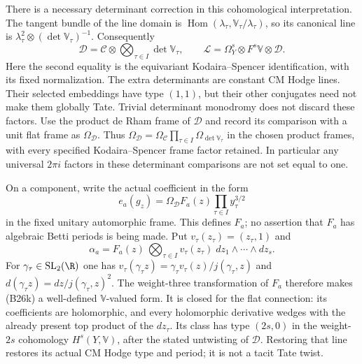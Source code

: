 \documentclass[11pt]{article}
\providecommand{\mathscr}[1]{\mathcal{#1}}
\theoremstyle{definition}\newtheorem{definition}[theorem]{Definition}\newtheorem{remark}[theorem]{Remark}
\begin{document}
There is a necessary determinant correction in this
cohomological interpretation.  The tangent bundle of the
line domain is $\operatorname{Hom}(\lambda_\tau,
\mathbb V_\tau/\lambda_\tau)$, so its canonical line is
$\lambda_\tau^2\otimes(\det\mathbb V_\tau)^{-1}$.
Consequently
\[
 \mathscr D=\mathscr C\otimes
                 \bigotimes_{\tau\in I}\det\mathbb V_\tau,
 \qquad
 \mathscr L=\Omega_Y^s\otimes F^s\mathbb V\otimes\mathscr D.
 \tag{B26i$'$}
\]
Here the second equality is the equivariant
Kodaira--Spencer identification, with its fixed
normalization.  The extra determinants are constant
CM Hodge lines.  Their selected embeddings have type
$(1,1)$, but their other conjugates need not make them
globally Tate.  Trivial determinant monodromy does not
discard these factors.  Use the product de Rham frame
of $\mathscr D$ and record its comparison with a unit
flat frame as $\Omega_{\mathscr D}$.  Thus
$\Omega_{\mathscr D}=\Omega_{\mathscr C}
\prod_{\tau\in I}\Omega_{\det\mathbb V_\tau}$ in the
chosen product frames, with every specified
Kodaira--Spencer frame factor retained.  In particular
any universal $2\pi i$ factors in these determinant
comparisons are not set equal to one.

On a component, write the actual coefficient in the form
\[
           e_a(g_z)=
              \Omega_{\mathscr D}F_a(z)
                          \prod_{\tau\in I}y_\tau^{3/2}
 \tag{B26j}
\]
in the fixed unitary automorphic frame.  This defines $F_a$;
no assertion that $F_a$ has algebraic Betti periods is being
made.  Put $v_\tau(z_\tau)=(z_\tau,1)$ and
\[
 \alpha_a=F_a(z)\,
       \bigotimes_{\tau\in I}v_\tau(z_\tau)
                   \;dz_1\wedge\cdots\wedge dz_s.
 \tag{B26k}
\]
For $\gamma_\tau\in\mathrm{SL}_2(\R)$ one has
$v_\tau(\gamma_\tau z)=
 \gamma_\tau v_\tau(z)/j(\gamma_\tau,z)$ and
$d(\gamma_\tau z)=dz/j(\gamma_\tau,z)^2$.
The weight-three transformation of $F_a$ therefore makes
(B26k) a well-defined $\mathbb V$-valued form.  It is closed
for the flat connection: its coefficients are holomorphic,
and every holomorphic derivative wedges with the already
present top product of the $dz_\tau$.
Its class has type $(2s,0)$ in the weight-$2s$ cohomology
$H^s(Y,\mathbb V)$, after the stated untwisting of
$\mathscr D$.  Restoring that line restores its actual CM
Hodge type and period; it is not a tacit Tate twist.
\end{document}
